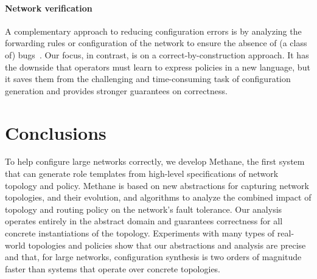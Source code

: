 \documentclass[numbers, 10pt, preprint]{sigplanconf}
\newcommand{\sysname}{{\small \sf Methane}\xspace}
\newcommand{\para}[1]{\paragraph*{\textbf{#1}}}
\begin{document}
\para{Network verification}
A complementary approach to reducing configuration errors is by analyzing the forwarding rules or configuration of the network to ensure the absence of (a class of) bugs~\cite{anteater,hsa,feamster+:rcc,ipassure,batfish,bagpipe,arc,era,symmetries}. Our focus, in contrast, is on a correct-by-construction approach. It has the downside that operators must learn to express policies in a new language, but it saves them from the challenging and time-consuming task of configuration generation and provides stronger guarantees on correctness.





%
%
%
%

\section{Conclusions}
\label{sec:conclusions}

To help configure large networks correctly, we develop \sysname, the first system that can generate role templates from high-level specifications of network topology and policy. \sysname is based on new abstractions for capturing network topologies, and their evolution, and algorithms to analyze the combined impact of topology and routing policy on the network's fault tolerance. Our analysis operates entirely in the abstract domain and guarantees correctness for all concrete instantiations of the topology. Experiments with many types of real-world topologies and policies show that our abstractions and analysis are precise and that, for large networks, configuration synthesis is two orders of magnitude faster than systems that operate over concrete topologies.
\end{document}
